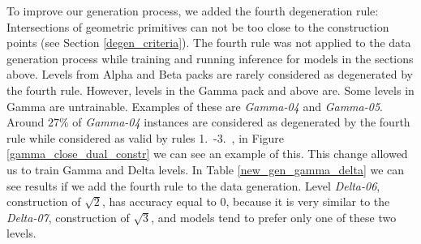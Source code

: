 To improve our generation process, we added the fourth degeneration rule: Intersections of geometric primitives can not be too close to the construction points (see Section \ref{degen_criteria}). The fourth rule was not applied to the data generation process while training and running inference for models in the sections above. Levels from Alpha and Beta packs are rarely considered as degenerated by the fourth rule. However, levels in the Gamma pack and above are. Some levels in Gamma are untrainable. Examples of these  are \textit{Gamma-04} and \textit{Gamma-05}. Around $27\%$ of \textit{Gamma-04} instances are considered as degenerated by the fourth rule while considered as valid by rules 1.~-3.~, in Figure \ref{gamma_close_dual_constr} we can see an example of this. This change allowed us to train Gamma and Delta levels. In Table \ref{new_gen_gamma_delta} we can see results if we add the fourth rule to the data generation. Level \textit{Delta-06}, construction of $\sqrt{2}$, has accuracy equal to $0$, because it is very similar to the \textit{Delta-07}, construction of $\sqrt{3}$, and models tend to prefer only one of these two levels. 


